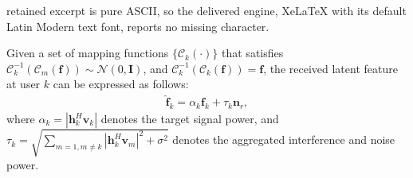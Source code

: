 \documentclass[10pt,a4paper]{amsart}
\begin{document}
retained excerpt is pure ASCII, so the delivered engine, XeLaTeX with its default Latin Modern text font, reports no missing character.
\begin{lemma}\label{lemma: received latent feature}
    Given a set of mapping functions $\{\mathcal{C}_k(\cdot)\}$ that satisfies $\mathcal{C}_k^{-1}(\mathcal{C}_m(\mathbf{f}))\sim\mathcal{N}(0,\mathbf{I})$, and $\mathcal{C}_k^{-1}(\mathcal{C}_k(\mathbf{f}))=\mathbf{f}$,  the received latent feature at user $k$ can be expressed as follows: 
    \begin{align}\label{eq: expression of received latent feature}
    \hat{\mathbf{f}}_k=\alpha_k\mathbf{f}_k+\tau_k\mathbf{n}_r,
    \end{align}
    where $\alpha_k=|\mathbf{h}_k^H\mathbf{v}_k|$ denotes the target signal power, and $\tau_k=\sqrt{\sum_{m=1,m\neq k}|\mathbf{h}_k^H\mathbf{v}_m|^2+\sigma^2}$ denotes the aggregated interference and  noise power. 
\end{lemma}
\end{document}
